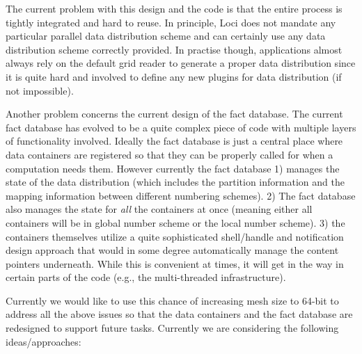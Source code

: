\documentclass{article}
\begin{document}
The current problem with this design and the code is that the entire
process is tightly integrated and hard to reuse.  In principle, Loci
does not mandate any particular parallel data distribution scheme and
can certainly use any data distribution scheme correctly provided.  In
practise though, applications almost always rely on the default grid
reader to generate a proper data distribution since it is quite hard and
involved to define any new plugins for data distribution (if not
impossible).

Another problem concerns the current design of the fact database.  The
current fact database has evolved to be a quite complex piece of code
with multiple layers of functionality involved.  Ideally the fact
database is just a central place where data containers are registered so
that they can be properly called for when a computation needs them.
However currently the fact database 1) manages the state of the data
distribution (which includes the partition information and the mapping
information between different numbering schemes). 2) The fact database
also manages the state for \textit{all} the containers at once (meaning
either all containers will be in global number scheme or the local
number scheme).  3) the containers themselves utilize a quite
sophisticated shell/handle and notification design approach that would
in some degree automatically manage the content pointers underneath.
While this is convenient at times, it will get in the way in certain
parts of the code (e.g., the multi-threaded infrastructure).

Currently we would like to use this chance of increasing mesh size to
64-bit to address all the above issues so that the data containers and
the fact database are redesigned to support future tasks.  Currently we
are considering the following ideas/approaches:
\end{document}
